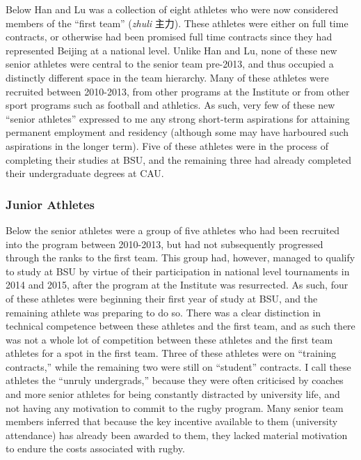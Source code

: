 \begin{CJK}{UTF8}{gbsn}
Below Han and Lu was a collection of eight athletes who were now considered members of the ``first team'' (\textit{zhuli} 主力).   These athletes were either on full time contracts, or otherwise had been promised full time contracts since they had represented Beijing at a national level.  Unlike Han and Lu, none of these new senior athletes were central to the senior team pre-2013, and thus occupied a distinctly different space in the team hierarchy.  Many of these athletes were recruited between 2010-2013, from other programs at the Institute or from other sport programs such as football and athletics.  As such, very few of these new ``senior athletes'' expressed to me any strong short-term aspirations for attaining permanent employment and residency (although some may have harboured such aspirations in the longer term). Five of these athletes were in the process of completing their studies at BSU, and the remaining three had already completed their undergraduate degrees at CAU.

\subsubsection{Junior Athletes}

Below the senior athletes were a group of five athletes who had been recruited into the program between 2010-2013, but had not subsequently progressed through the ranks to the first team. This group had, however, managed to qualify to study at BSU by virtue of their participation in national level tournaments in 2014 and 2015, after the program at the Institute was resurrected.  As such, four of these athletes were beginning their first year of study at BSU, and the remaining athlete was preparing to do so. There was a clear distinction in technical competence between these athletes and the first team, and as such there was not a whole lot of competition between these athletes and the first team athletes for a spot in the first team.  Three of these athletes were on ``training contracts,'' while the remaining two were still on ``student'' contracts.  I call these athletes the ``unruly undergrads,'' because they were often criticised by coaches and more senior athletes for being constantly distracted by university life, and not having any motivation to commit to the rugby program.  Many senior team members inferred that because the key incentive available to them (university attendance) has already been awarded to them, they lacked material motivation to endure the costs associated with rugby.



\end{CJK}
